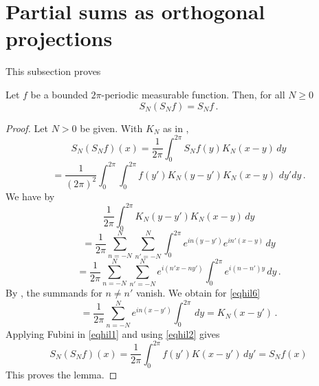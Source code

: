 \section{Partial sums as orthogonal projections}
\label{10projection}

This subsection proves 






\begin{lemma}
\label{partial-sum-projection}
  Let $f$ be a bounded $2\pi$-periodic measurable function. Then, for all $N\ge 0$
   \begin{equation}\label{projection}
   S_N(S_N f)=S_Nf\, .
   \end{equation}
   \end{lemma}
\begin{proof}
Let $N>0$ be given. With $K_N$ as in ,
\begin{equation*}
S_N (S_Nf) (x)=
\frac{1}{2\pi} \int_0^{2\pi} S_Nf(y)K_N(x-y)\, dy
\end{equation*}
\begin{equation}\label{eqhil1}
=
\frac{1}{(2\pi)^2}\int_0^{2\pi} \int_0^{2\pi} f(y')K_N(y-y') K_N(x-y)\, \, dy' dy\, .
\end{equation}
We have by 
\begin{equation*}
\frac{1}{2\pi}\int_0^{2\pi} K_N(y-y') K_N(x-y)\, dy
\end{equation*}
\begin{equation*}
=\frac{1}{2\pi}\sum_{n=-N}^N\sum_{n'=-N}^N
\int_0^{2\pi} e^{in(y-y')}e^{in'(x-y)}\, dy
\end{equation*}
\begin{equation}\label{eqhil6}
=\frac{1}{2\pi}\sum_{n=-N}^N\sum_{n'=-N}^N
e^{i(n'x-ny')}\int_0^{2\pi} e^{i(n-n')y}\, dy\, .
\end{equation}
By , the summands for $n\neq n'$ vanish.
We obtain for \eqref{eqhil6}
\begin{equation}\label{eqhil2}
=\frac{1}{2\pi}\sum_{n=-N}^N
e^{in(x-y')}\int_0^{2\pi} \, dy=K_N(x-y')\, .
\end{equation}
Applying Fubini in \eqref{eqhil1} and using
\eqref{eqhil2} gives
\begin{equation}
S_N(S_Nf)(x)=
\frac{1}{2\pi} \int_0^{2\pi} f(y')K(x-y') \, dy'=S_N f(x)
\end{equation}
This proves the lemma.
\end{proof}
